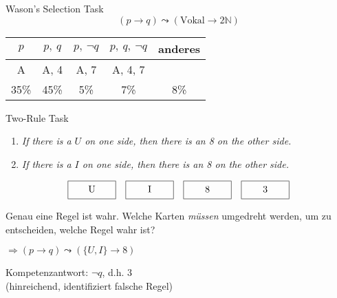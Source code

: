 \begin{frame}{Wason's Selection Task {\scriptsize \cite[S.~44-46]{stenningHumanReasoningCognitive2008}}}
    $$(p \to q) \leadsto (\text{Vokal} \to 2\mathbb{N})$$

    \begin{center}
        \begin{tabular}{c | c | c | c | c}
            $p$ &$p,~q$ &\alert{$p, ~\lnot q$} &$p, ~q, ~\lnot q$ &anderes \\
            \hline
            A &A, 4 &\alert{A, 7} &A, 4, 7 & \\
            \hline \hline
            35\% &45\% &\alert{5\%} &7\% &8\%
        \end{tabular}
    \end{center}
\end{frame}


\begin{frame}{Two-Rule Task {\scriptsize \cite[S.~61-63]{stenningHumanReasoningCognitive2008}}}
    \begin{enumerate}
        \item \emph{If there is a $U$ on one side, then there is an 8 on the other side.}
        \item \emph{If there is a $I$ on one side, then there is an 8 on the other side.}
    \end{enumerate}

    \[
        \framebox[5em][c]{U\strut}\quad
        \framebox[5em][c]{I\strut}\quad
        \framebox[5em][c]{8\strut}\quad
        \framebox[5em][c]{3\strut}
    \]

    Genau eine Regel ist wahr. Welche Karten \emph{müssen} umgedreht werden, um zu entscheiden, welche Regel wahr ist?

    $\Rightarrow (p \to q) \leadsto (\{U, I\} \to 8)$

    Kompetenzantwort: $\lnot q$, d.h. $3$\\
    {\footnotesize (hinreichend, identifiziert falsche Regel)}
\end{frame}
